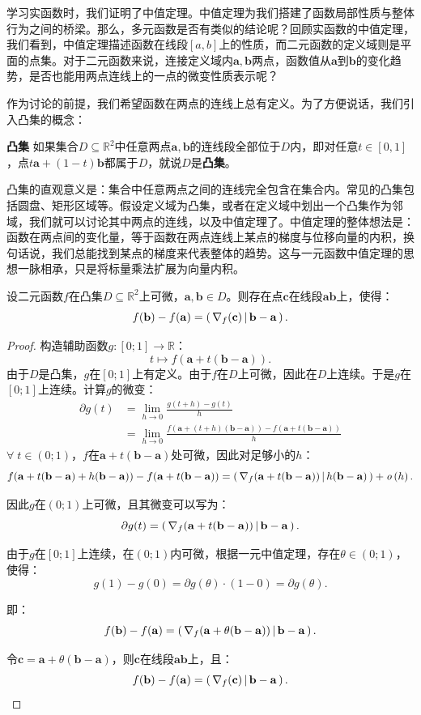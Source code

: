 \documentclass[12pt,UTF8,fontset=none]{ctexbook}
\begin{document}
学习实函数时，我们证明了中值定理。中值定理为我们搭建了函数局部性质与整体行为之间的桥梁。那么，多元函数是否有类似的结论呢？回顾实函数的中值定理，我们看到，中值定理描述函数在线段$[a,b]$上的性质，而二元函数的定义域则是平面的点集。对于二元函数来说，连接定义域内$\mathbf{a}, \mathbf{b}$两点，函数值从$\mathbf{a}$到$\mathbf{b}$的变化趋势，是否也能用两点连线上的一点的微变性质表示呢？

作为讨论的前提，我们希望函数在两点的连线上总有定义。为了方便说话，我们引入凸集的概念：
\begin{df}{\textbf{凸集}}
如果集合$D\subseteq \mathbb{R}^2$中任意两点$\mathbf{a},\mathbf{b}$的连线段全部位于$D$内，即对任意$t\in[0,1]$，点$t\mathbf{a}+(1-t)\mathbf{b}$都属于$D$，就说$D$是\textbf{凸集}。
\end{df}

凸集的直观意义是：集合中任意两点之间的连线完全包含在集合内。常见的凸集包括圆盘、矩形区域等。假设定义域为凸集，或者在定义域中划出一个凸集作为邻域，我们就可以讨论其中两点的连线，以及中值定理了。中值定理的整体想法是：函数在两点间的变化量，等于函数在两点连线上某点的梯度与位移向量的内积，换句话说，我们总能找到某点的梯度来代表整体的趋势。这与一元函数中值定理的思想一脉相承，只是将标量乘法扩展为向量内积。

\begin{tm}
设二元函数$f$在凸集$D\subseteq \mathbb{R}^2$上可微，$\mathbf{a},\mathbf{b}\in D$。则存在点$\mathbf{c}$在线段$\mathbf{ab}$上，使得：
$$f(\mathbf{b})-f(\mathbf{a})=\displaystyle\left( \,\nabla_f(\mathbf{c}) \,\middle\vert \,\mathbf{b}-\mathbf{a} \,\right).$$
\end{tm}

\begin{proof}
构造辅助函数$g:[0;1]\to\mathbb{R}$：
$$t \mapsto f(\mathbf{a}+t(\mathbf{b}-\mathbf{a})).$$
由于$D$是凸集，$g$在$[0;1]$上有定义。由于$f$在$D$上可微，因此在$D$上连续。于是$g$在$[0;1]$上连续。计算$g$的微变：
\begin{align*}
\partial g(t)&=\lim_{h\to 0}\frac{g(t+h)-g(t)}{h}\\
&=\lim_{h\to 0}\frac{f(\mathbf{a}+(t+h)(\mathbf{b}-\mathbf{a}))-f(\mathbf{a}+t(\mathbf{b}-\mathbf{a}))}{h}
\end{align*}
$\forall \; t\in(0;1)$，$f$在$\mathbf{a}+t(\mathbf{b}-\mathbf{a})$处可微，因此对足够小的$h$：
$$f(\mathbf{a}+t(\mathbf{b}-\mathbf{a})+h(\mathbf{b}-\mathbf{a}))-f(\mathbf{a}+t(\mathbf{b}-\mathbf{a}))=\displaystyle\left( \,\nabla_f(\mathbf{a}+t(\mathbf{b}-\mathbf{a})) \,\middle\vert \,h(\mathbf{b}-\mathbf{a}) \,\right)+\mathit{o}\left(h\right).$$

因此$g$在$(0;1)$上可微，且其微变可以写为：
$$\partial g(t)=\displaystyle\left( \,\nabla_f(\mathbf{a}+t(\mathbf{b}-\mathbf{a})) \,\middle\vert \,\mathbf{b}-\mathbf{a} \,\right).$$

由于$g$在$[0;1]$上连续，在$(0;1)$内可微，根据一元中值定理，存在$\theta\in(0;1)$，使得：
$$g(1)-g(0)=\partial g(\theta)\cdot(1-0) = \partial g(\theta).$$

即：
$$f(\mathbf{b})-f(\mathbf{a})=\displaystyle\left( \,\nabla_f(\mathbf{a}+\theta(\mathbf{b}-\mathbf{a})) \,\middle\vert \,\mathbf{b}-\mathbf{a} \,\right).$$

令$\mathbf{c}=\mathbf{a}+\theta(\mathbf{b}-\mathbf{a})$，则$\mathbf{c}$在线段$\mathbf{ab}$上，且：
$$f(\mathbf{b})-f(\mathbf{a})=\displaystyle\left( \,\nabla_f(\mathbf{c}) \,\middle\vert \,\mathbf{b}-\mathbf{a} \,\right).$$
\end{proof}
\end{document}
